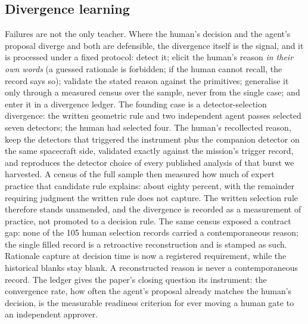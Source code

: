\subsection{Divergence learning} \label{sec:divergence}

Failures are not the only teacher. Where the human's decision and the
agent's proposal diverge and both are defensible, the divergence itself is
the signal, and it is processed under a fixed protocol: detect it; elicit
the human's reason \emph{in their own words} (a guessed rationale is
forbidden; if the human cannot recall, the record says so); validate the
stated reason against the primitives; generalise it only through a
measured census over the sample, never from the single case; and enter it
in a divergence ledger. The founding case is a detector-selection
divergence: the written geometric rule and two independent agent passes
selected seven detectors\prov; the human had selected four\prov. The human's
recollected reason, keep the detectors that triggered the instrument plus
the companion detector on the same spacecraft side, validated exactly
against the mission's trigger record, and reproduces the detector choice of
every published analysis of that burst we harvested. A census of the full
sample\prov{} then measured how much of expert practice that candidate rule
explains: about eighty percent\prov, with the remainder requiring judgment
the written rule does not capture. The written selection rule therefore
stands unamended, and the divergence is recorded as a measurement of
practice, not promoted to a decision rule. The same census exposed a
contract gap: none of the 105 human selection records\prov{} carried a
contemporaneous reason; the single filled record is a retroactive
reconstruction and is stamped as such. Rationale capture at decision time
is now a registered requirement, while the historical blanks stay blank. A
reconstructed reason is never a contemporaneous record. The ledger gives
the paper's closing question its instrument: the convergence rate, how
often the agent's proposal already matches the human's decision, is the
measurable readiness criterion for ever moving a human gate to an
independent approver.
